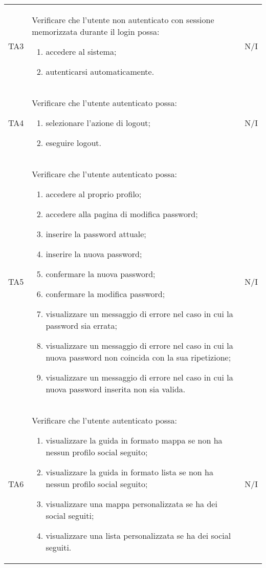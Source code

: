 {\begin{longtable}{C{.1\freewidth} C{.80\freewidth} C{.1\freewidth}}
    TA3 & Verificare che l'utente non autenticato con sessione memorizzata durante il login possa:\begin{enumerate}
        \item accedere al sistema;
        \item autenticarsi automaticamente.
    \end{enumerate} & N/I \\

    TA4 & Verificare che l'utente autenticato possa:\begin{enumerate}
        \item selezionare l'azione di logout;
        \item eseguire logout.
    \end{enumerate} & N/I  \\

    TA5 & Verificare che l'utente autenticato possa:\begin{enumerate}
        \item accedere al proprio profilo;
        \item accedere alla pagina di modifica password;
        \item inserire la password attuale;
        \item inserire la nuova password;
        \item confermare la nuova password;
        \item confermare la modifica password;
        \item visualizzare un messaggio di errore nel caso in cui la password sia errata;
        \item visualizzare un messaggio di errore nel caso in cui la nuova password non coincida con la sua ripetizione;
        \item visualizzare un messaggio di errore nel caso in cui la nuova password inserita non sia valida.
    \end{enumerate} & N/I  \\

    TA6 & Verificare che l'utente autenticato possa:\begin{enumerate}
        \item visualizzare la guida in formato mappa se non ha nessun profilo social seguito;
        \item visualizzare la guida in formato lista se non ha nessun profilo social seguito;
        \item visualizzare una mappa personalizzata se ha dei social seguiti;
        \item visualizzare una lista personalizzata se ha dei social seguiti.
    \end{enumerate} & N/I  \\


\end{longtable}}
